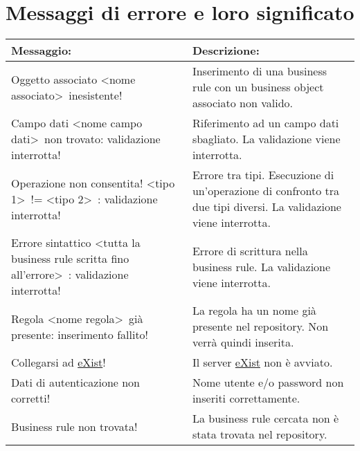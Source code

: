 \section{Messaggi di errore e loro significato}
\begin{table}[htbp]
\begin{tabular}{||p{6.5cm}||p{6.5cm}||}
\hline
\textbf{Messaggio:} & \textbf{Descrizione:} \\ \hline
Oggetto associato \textless nome associato\textgreater\ inesistente! & Inserimento di una business rule con un business object associato non valido. \\ \hline
Campo dati \textless nome campo dati\textgreater\ non trovato: validazione interrotta! & Riferimento ad un campo dati sbagliato. La validazione viene interrotta. \\ \hline
Operazione non consentita! \textless tipo 1\textgreater\ != \textless tipo 2\textgreater\ : validazione interrotta! & Errore tra tipi. Esecuzione di un'operazione di confronto tra due tipi diversi. La validazione viene interrotta. \\ \hline
Errore sintattico \textless tutta la business rule scritta fino all'errore\textgreater\ : validazione interrotta! & Errore di scrittura nella business rule. La validazione viene interrotta. \\ \hline
Regola \textless nome regola\textgreater\  gi\`a presente: inserimento fallito! & La regola ha un nome gi\`a presente nel repository. Non verr\`a quindi inserita. \\ \hline
Collegarsi ad \underline{eXist}! & Il server \underline{eXist} non \`e avviato. \\ \hline
Dati di autenticazione non corretti! & Nome utente e/o password non inseriti correttamente. \\ \hline
Business rule non trovata! & La business rule cercata non \`e stata trovata nel repository. \\ \hline
\end{tabular} \\
\end{table}



